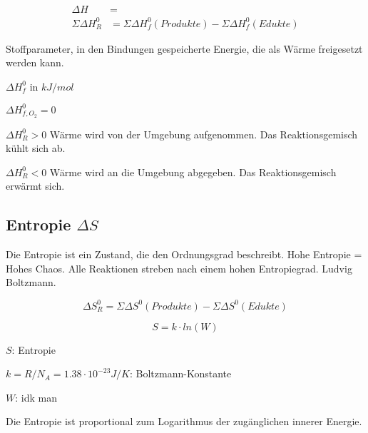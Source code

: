 {\large
	\begin{equation}
		\begin{split}
			\Delta H &= \\ 
			\Sigma \Delta H^0_R &= \Sigma \Delta H^0_f (Produkte) - \Sigma \Delta H^0_f (Edukte)
		\end{split}
	\end{equation}
}

\begin{definition}[Standardbildungsenthalpie]
	Stoffparameter, in den Bindungen gespeicherte Energie, die als Wärme freigesetzt werden kann.
	
	$\Delta H^0_f$ in $kJ/mol$
	
	\begin{note}
		$\Delta H^0_{f,O_2} = 0$
	\end{note}

\end{definition}

\begin{definition}
$\Delta H^0_R > 0$
Wärme wird von der Umgebung aufgenommen. Das Reaktionsgemisch kühlt sich ab.
\end{definition}

\begin{definition}
$\Delta H^0_R < 0$
Wärme wird an die Umgebung abgegeben. Das Reaktionsgemisch erwärmt sich.
\end{definition}

\subsection{Entropie $\Delta S$}

Die Entropie ist ein Zustand, die den Ordnungsgrad beschreibt. Hohe Entropie = Hohes Chaos. Alle Reaktionen streben nach einem hohen Entropiegrad. Ludvig Boltzmann.

{\large
	\begin{equation}
		\Delta S^0_R = \Sigma \Delta S^0 (Produkte) - \Sigma \Delta S^0 (Edukte)
	\end{equation}
}

\begin{definition}[Entropieformel]
	{\large
		\begin{equation}
				S = k \cdot ln(W)
		\end{equation}
	}
	
	$S$: Entropie
	
	$k=R/N_A=1.38\cdot 10^{-23} J/K$: Boltzmann-Konstante 
	
	$W$: idk man
	
	Die Entropie ist proportional zum Logarithmus der zugänglichen innerer Energie.
\end{definition}

